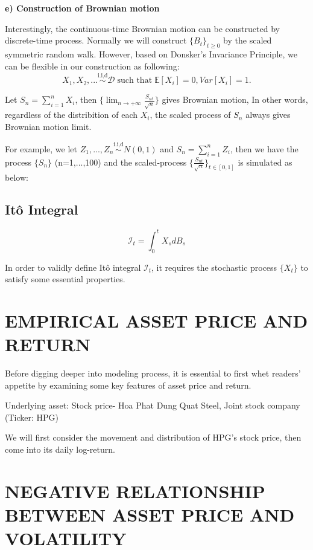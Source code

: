 \documentclass[12pt,a4paper,oneside]{book}
\begin{document}
	\textbf{e) Construction of Brownian motion}
	
	Interestingly, the continuous-time Brownian motion can be constructed by discrete-time process. Normally we will construct $\{B_t\}_{t\geq 0}$ by the scaled symmetric random walk. However, based on Donsker's Invariance Principle, we can be flexible in our construction as following:
	\[X_1, X_2,... \overset{\text{i.i,d}}{\sim} \mathcal{D}\; \text{such that}\; \mathbb{E}[X_i]=0, Var[X_i]=1.\]

	Let $S_n= \sum_{i=1}^{n}X_i$, then $\{\lim_{n \to +\infty} \frac{S_{nt}}{\sqrt{n}}\}$ gives Brownian motion, In other words, regardless of the distribition of each $X_i$, the scaled process of $S_n$ always gives Brownian motion limit.
	
	For example, we let $Z_1,...,Z_n \overset{\text{i.i,d}}{\sim} N(0,1)$ and $S_n= \sum_{i=1}^{n}Z_i$, then we have the process $\{S_n\}$ (n=1,...,100) and the scaled-process $\{\frac{S_{nt}}{\sqrt{n}}\}_{t\in [0,1]}$ is simulated as below:
	
	\subsection{It\^{o} Integral }
	\begin{equation} \label{eqn: ito integral}
	    \mathcal{I}_t= \int_{0}^t X_s dB_s
	\end{equation}
	
	In order to validly define It\^{o} integral $\mathcal{I}_t$, it requires the stochastic process $\{X_t\}$ to satisfy some essential properties. \\
	

    \section{EMPIRICAL ASSET PRICE AND RETURN}

	Before digging deeper into modeling process, it is essential to first whet readers' appetite by examining some key features of asset price and return.
	
	Underlying asset: Stock price- Hoa Phat Dung Quat Steel, Joint stock company (Ticker: HPG)
	
	We will first consider the movement and distribution of HPG's stock price, then come into its daily log-return. \\
		

\section{NEGATIVE RELATIONSHIP BETWEEN ASSET PRICE AND VOLATILITY}
\end{document}
